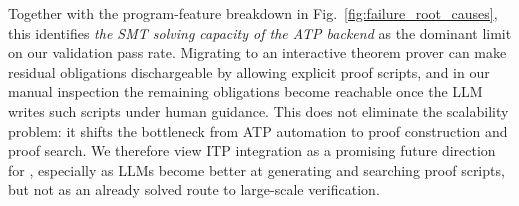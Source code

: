 \DIFaddbegin
Together with the program-feature breakdown in
Fig.~\ref{fig:failure_root_causes}, this identifies \emph{the SMT solving capacity of
the ATP backend} as the dominant limit on our validation pass rate. Migrating to an interactive theorem prover can make residual obligations dischargeable by allowing explicit proof scripts, and in our manual inspection the remaining obligations become reachable once the LLM writes such scripts under human guidance. This does not eliminate the scalability problem: it shifts the bottleneck from ATP automation to proof construction and proof search. We therefore view ITP integration as a promising future direction for \toolname, especially as LLMs become better at generating and searching proof scripts, but not as an already solved route to large-scale verification.
\DIFaddend
